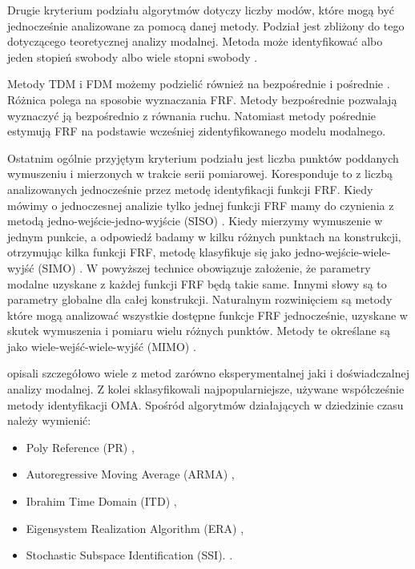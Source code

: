 Drugie kryterium podziału algorytmów dotyczy liczby modów, które mogą być jednocześnie analizowane za pomocą danej metody. Podział jest zbliżony do tego dotyczącego teoretycznej analizy modalnej. Metoda może identyfikować albo jeden stopień swobody  albo wiele stopni swobody .

Metody TDM i FDM możemy podzielić również na bezpośrednie  i pośrednie . Różnica polega na sposobie wyznaczania FRF. Metody bezpośrednie pozwalają wyznaczyć ją bezpośrednio z równania ruchu. Natomiast metody pośrednie estymują FRF na podstawie wcześniej zidentyfikowanego modelu modalnego.

Ostatnim ogólnie przyjętym kryterium podziału jest liczba punktów poddanych wymuszeniu i mierzonych w trakcie serii pomiarowej. Koresponduje to z liczbą analizowanych jednocześnie przez metodę identyfikacji funkcji FRF. Kiedy mówimy o jednoczesnej analizie tylko jednej funkcji FRF mamy do czynienia z metodą jedno-wejście-jedno-wyjście (SISO) . Kiedy mierzymy wymuszenie w jednym punkcie, a odpowiedź badamy w kilku różnych punktach na konstrukcji, otrzymując kilka funkcji FRF, metodę klasyfikuje się jako jedno-wejście-wiele-wyjść (SIMO) . W powyższej technice obowiązuje założenie, że parametry modalne uzyskane z każdej funkcji FRF będą takie same. Innymi słowy są to parametry globalne dla całej konstrukcji. Naturalnym rozwinięciem są metody które mogą analizować wszystkie dostępne funkcje FRF jednocześnie, uzyskane w skutek wymuszenia i pomiaru wielu różnych punktów. Metody te określane są jako wiele-wejść-wiele-wyjść (MIMO) .

\cite{Maia1997} opisali szczegółowo wiele z metod zarówno eksperymentalnej jaki i doświadczalnej analizy modalnej. Z kolei \cite{Brincker2015} sklasyfikowali najpopularniejsze, używane współcześnie metody identyfikacji OMA. Spośród algorytmów działających w dziedzinie czasu należy wymienić:
\begin{itemize}[noitemsep]
\item Poly Reference (PR) \parencite{Norton2009,Vold1982},
\item Autoregressive Moving Average (ARMA) \parencite{Shi1987,Huang2000,Giorcelli1994},
\item Ibrahim Time Domain (ITD) \parencite{Ibrahim1983,Pappa1985a},
\item Eigensystem Realization Algorithm (ERA) \parencite{Juang1985,Pappa1985,Juang1988},
\item Stochastic Subspace Identification (SSI). \parencite{VanOverschee1996,Peeters1999a,Peeters2000}. 
\end{itemize}

